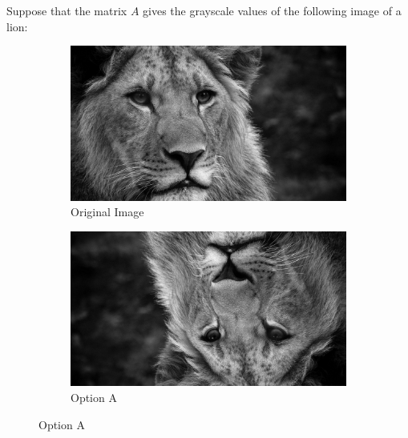 \documentclass{ximera}
\begin{document}
\begin{problem}


Suppose that the matrix $A$ gives the grayscale values of the following image of a lion:

\begin{figure}[h]
  \centering
  \begin{subfigure}[b]{0.45\textwidth}
    \centering
    \includegraphics[width=\textwidth]{test_image.jpg}
    \caption{Original Image}
    \label{fig:original}
  \end{subfigure}
  \hfill
  \begin{subfigure}[b]{0.45\textwidth}
    \centering
    \includegraphics[width=\textwidth]{test_image_rot_2.jpg}
    \caption{Option A}
    \label{fig:optionA}
  \end{subfigure}
\end{figure}


\end{problem}
\end{document}

